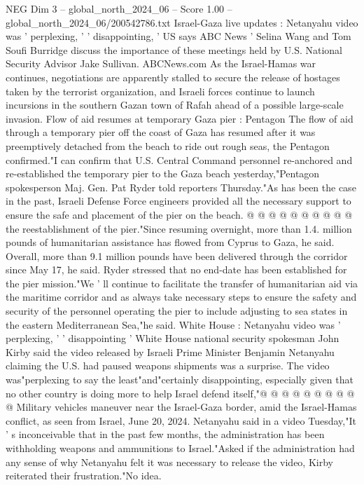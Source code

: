 \begin{textsample}{NEG Dim 3 – global\_north\_2024\_06 – Score 1.00 – global\_north\_2024\_06/200542786.txt}  \label{ex:f3_neg_388}
Israel-Gaza live updates : Netanyahu video was ' perplexing, ' ' disappointing, ' US says ABC News ' Selina Wang and Tom Soufi Burridge discuss the importance of these meetings held by U.S.
National Security Advisor Jake Sullivan.
ABCNews.com As the Israel-Hamas war continues, negotiations are apparently stalled to secure the release of hostages taken by the terrorist organization, and Israeli forces continue to launch incursions in the southern Gazan town of Rafah ahead of a possible large-scale invasion.
Flow of aid resumes at temporary Gaza pier : Pentagon The flow of aid through a temporary pier off the coast of Gaza has resumed after it was preemptively detached from the beach to ride out rough seas, the Pentagon confirmed."I can confirm that U.S.
Central Command personnel re-anchored and re-established the temporary pier to the Gaza beach yesterday,"Pentagon spokesperson Maj.
Gen.
Pat Ryder told reporters Thursday."As has been the case in the past, Israeli Defense Force engineers provided all the necessary support to ensure the safe and placement of the pier on the beach. @ @ @ @ @ @ @ @ @ @ the reestablishment of the pier."Since resuming overnight, more than 1.4. million pounds of humanitarian assistance has flowed from Cyprus to Gaza, he said.
Overall, more than 9.1 million pounds have been delivered through the corridor since May 17, he said.
Ryder stressed that no end-date has been established for the pier mission."We ' ll continue to facilitate the transfer of humanitarian aid via the maritime corridor and as always take necessary steps to ensure the safety and security of the personnel operating the pier to include adjusting to sea states in the eastern Mediterranean Sea,"he said.
White House : Netanyahu video was ' perplexing, ' ' disappointing ' White House national security spokesman John Kirby said the video released by Israeli Prime Minister Benjamin Netanyahu claiming the U.S. had paused weapons shipments was a surprise.
The video was"perplexing to say the least"and"certainly disappointing, especially given that no other country is doing more to help Israel defend itself,"@ @ @ @ @ @ @ @ @ @ Military vehicles maneuver near the Israel-Gaza border, amid the Israel-Hamas conflict, as seen from Israel, June 20, 2024.
Netanyahu said in a video Tuesday,"It ' s inconceivable that in the past few months, the administration has been withholding weapons and ammunitions to Israel."Asked if the administration had any sense of why Netanyahu felt it was necessary to release the video, Kirby reiterated their frustration."No idea.

\end{textsample}
